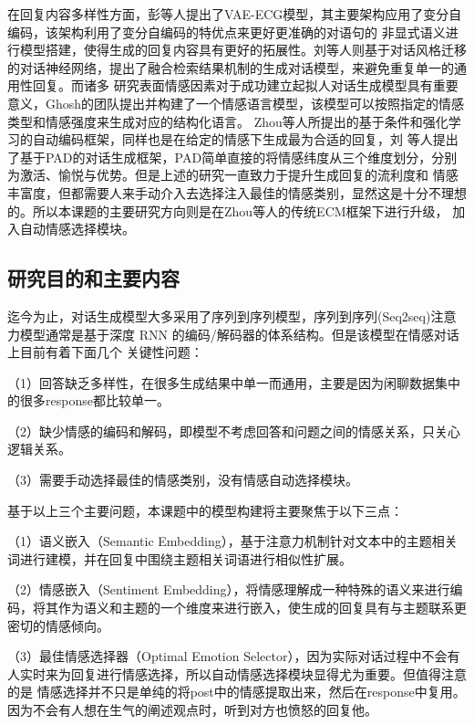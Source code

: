 \documentclass[supercite]{HustGraduPaper}
\theoremstyle{definition}
\begin{document}
在回复内容多样性方面，彭\cite{彭叶红2019基于主题模型与变分自编码的情感对话生成技术研究}等人提出了VAE-ECG模型，其主要架构应用了变分自编码，该架构利用了变分自编码的特优点来更好更准确的对语句的
非显式语义进行模型搭建，使得生成的回复内容具有更好的拓展性。刘\cite{对话风格迁移}等人则基于对话风格迁移的对话神经网络，提出了融合检索结果机制的生成对话模型，来避免重复单一的通用性回复。而诸多
研究表面情感因素对于成功建立起拟人对话生成模型具有重要意义，Ghosh\cite{ghosh2017affect}的团队提出并构建了一个情感语言模型，该模型可以按照指定的情感类型和情感强度来生成对应的结构化语言。
Zhou等人\cite{DBLP:journals/corr/ZhouHZZL17}所提出的基于条件和强化学习的自动编码框架，同样也是在给定的情感下生成最为合适的回复，刘\cite{刘宁2019人机交互的情感拟人化策略研究}
等人提出了基于PAD的对话生成框架，PAD简单直接的将情感纬度从三个维度划分，分别为激活、愉悦与优势。但是上述的研究一直致力于提升生成回复的流利度和
情感丰富度，但都需要人来手动介入去选择注入最佳的情感类别，显然这是十分不理想的。所以本课题的主要研究方向则是在Zhou\cite{DBLP:journals/corr/ZhouHZZL17}等人的传统ECM框架下进行升级，
加入自动情感选择模块。

\subsection{研究目的和主要内容}
迄今为止，对话生成模型大多采用了序列到序列模型，序列到序列(Seq2seq)注意力模型通常是基于深度 RNN 的编码/解码器的体系结构。但是该模型在情感对话上目前有着下面几个
关键性问题：

（1）回答缺乏多样性，在很多生成结果中单一而通用，主要是因为闲聊数据集中的很多response都比较单一。

（2）缺少情感的编码和解码，即模型不考虑回答和问题之间的情感关系，只关心逻辑关系。

（3）需要手动选择最佳的情感类别，没有情感自动选择模块。

基于以上三个主要问题，本课题中的模型构建将主要聚焦于以下三点：

（1）语义嵌入（Semantic Embedding），基于注意力机制针对文本中的主题相关词进行建模，并在回复中围绕主题相关词语进行相似性扩展。

（2）情感嵌入（Sentiment Embedding），将情感理解成一种特殊的语义来进行编码，将其作为语义和主题的一个维度来进行嵌入，使生成的回复具有与主题联系更密切的情感倾向。

（3）最佳情感选择器\cite{wei2019emotion}（Optimal Emotion Selector），因为实际对话过程中不会有人实时来为回复进行情感选择，所以自动情感选择模块显得尤为重要。但值得注意的是
情感选择并不只是单纯的将post中的情感提取出来，然后在response中复用。因为不会有人想在生气的阐述观点时，听到对方也愤怒的回复他。
\end{document}
